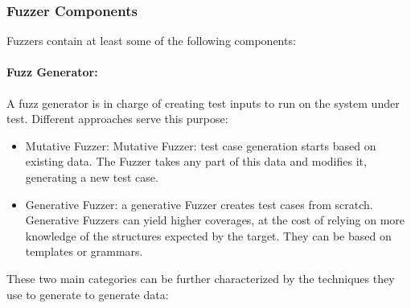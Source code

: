 


\subsubsection{Fuzzer Components}

Fuzzers contain at least some of the following components:

\paragraph{Fuzz Generator:}

A fuzz generator is in charge of creating test inputs to run on the system under test. Different
approaches serve this purpose\cite{mcnallyFuzzingStateArt2012}:

\begin{itemize}\label{ss:fuzzer-components}
    \item Mutative Fuzzer: Mutative Fuzzer: test case generation starts based on existing data. The Fuzzer takes any part of this data and modifies it, generating a new test case.
    \item Generative Fuzzer: a generative Fuzzer creates test cases from scratch. Generative Fuzzers can yield higher coverages, at the cost of relying on more knowledge of the structures expected by the target. They can be based on templates or grammars.
\end{itemize}

These two main categories can be further characterized by the techniques they use to generate to generate data\cite{mcnallyFuzzingStateArt2012}:

